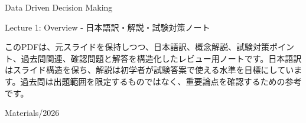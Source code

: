 \documentclass[a4paper,10pt]{article}
\begin{document}
\begin{titlepage}
\centering
\vspace*{2cm}
{\Huge Data Driven Decision Making\par}
\vspace{0.5cm}
{\Large Lecture 1: Overview - 日本語訳・解説・試験対策ノート\par}
\vspace{1cm}
\begin{minipage}{0.88\textwidth}
このPDFは、元スライドを保持しつつ、日本語訳、概念解説、試験対策ポイント、過去問関連、確認問題と解答を構造化したレビュー用ノートです。日本語訳はスライド構造を保ち、解説は初学者が試験答案で使える水準を目標にしています。過去問は出題範囲を限定するものではなく、重要論点を確認するための参考です。
\end{minipage}
\vfill
{\large Materials/2026}\par
\end{titlepage}
\tableofcontents
\clearpage

\end{document}
